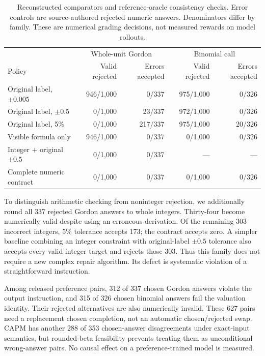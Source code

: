 \begin{table}[t]
\centering\small
\begin{tabular}{lrrrr}
\toprule
 & \multicolumn{2}{c}{Whole-unit Gordon} & \multicolumn{2}{c}{Binomial call}\\
Policy & Valid rejected & Errors accepted & Valid rejected & Errors accepted\\
\midrule
Original label, $\pm0.005$ & 946/1,000 & 0/337 & 975/1,000 & 0/326\\
Original label, $\pm0.5$ & 0/1,000 & 23/337 & 972/1,000 & 0/326\\
Original label, 5\% & 0/1,000 & 217/337 & 975/1,000 & 20/326\\
Visible formula only & 946/1,000 & 0/337 & 0/1,000 & 0/326\\
Integer + original $\pm0.5$ & 0/1,000 & 0/337 & --- & ---\\
Complete numeric contract & 0/1,000 & 0/337 & 0/1,000 & 0/326\\
\bottomrule
\end{tabular}
\caption{Reconstructed comparators and reference-oracle consistency checks. Error controls are source-authored rejected
numeric answers. Denominators differ by family. These are numerical grading decisions, not measured rewards on model rollouts.}
\label{tab:comparators}
\end{table}

To distinguish arithmetic checking from noninteger rejection, we additionally round all 337 rejected Gordon answers to whole integers. Thirty-four become numerically valid despite using an erroneous derivation.
Of the remaining 303 incorrect integers, 5\% tolerance accepts 173; the contract accepts zero. A simpler baseline combining an integer constraint with original-label $\pm0.5$ tolerance also accepts every valid
integer target and rejects those 303. Thus this family does not require a new complex repair algorithm. Its defect is systematic violation of a straightforward instruction.

Among released preference pairs, 312 of 337 chosen Gordon answers violate the output instruction, and 315 of 326 chosen binomial answers fail the valuation identity. Their rejected alternatives are also
numerically invalid. These 627 pairs need a replacement chosen completion, not an automatic chosen/rejected swap. CAPM has another 288 of 353 chosen-answer disagreements under exact-input semantics, but
rounded-beta feasibility prevents treating them as unconditional wrong-answer pairs. No causal effect on a preference-trained model is measured.

